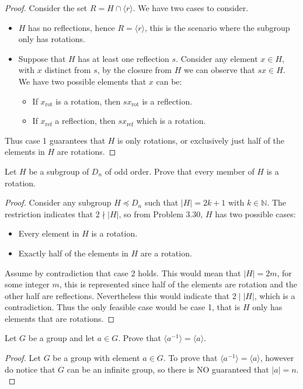 \begin{assignment}[
  header=HeaderA,
  body=BodyA,
  title={Homework 2},
  duedate={17-February-2026},
  toc=false,
  toctitle={This appears on the Table of contents.},
  exlist=false
]
\begin{exer}[Problem 3.30]
\begin{proof}
Consider the set $R = H \cap \langle r \rangle$. We have two cases to consider.
\begin{itemize}
    \item[Case 1:] $H$ has no reflections, hence $R = \langle r\rangle$, this is the scenario where the subgroup only has rotations.
    \item[Case 2:] Suppose that $H$ has at least one reflection $s$. Consider any element $x \in H$, with $x$ distinct from $s$, by the closure from $H$ we can observe that $sx \in H$. We have two possible elements that $x$ can be:
    \begin{itemize}
        \item If $x_{\text{rot}}$ is a rotation, then $sx_{\text{rot}}$ is a reflection.  
        \item If $x_{\text{ref}}$ a reflection, then $sx_{\text{ref}}$ which is a rotation. 
    \end{itemize}
\end{itemize}
Thus case 1 guarantees that $H$ is only rotations, or exclusively just half of the elements in $H$ are rotations.
\end{proof}
\end{exer}

\begin{exer}[Problem 3.31]
Let $H$ be a subgroup of $D_n$ of odd order. Prove that every member of $H$ is a rotation.
\begin{proof}
Consider any subgroup $H \preccurlyeq D_n$ such that $|H| = 2k + 1$ with $k \in \mathbb{N}$. The restriction indicates that $2 \nmid |H|$, so from Problem 3.30, $H$ has two possible cases:
\begin{itemize}
    \item[Case 1:] Every element in $H$ is a rotation.
    \item[Case 2:] Exactly half of the elements in $H$ are a rotation. 
\end{itemize}
Assume by contradiction that case 2 holds. This would mean that $|H| = 2m$, for some integer $m$, this is represented since half of the elements are rotation and the other half are reflections.  Nevertheless this would indicate that $2 \mid |H|$, which is a contradiction. Thus the only feasible case would be case 1, that is $H$ only has elements that are rotations. 
\end{proof}
\end{exer}

\begin{exer}[Problem 4.11]
Let $G$ be a group and let $a \in G$. Prove that $\langle a^{-1} \rangle = \langle a \rangle$.
\begin{proof}
Let $G$ be a group with element $a \in G$. To prove that $\langle a^{-1} \rangle = \langle a \rangle$, however do notice that $G$ can be an infinite group, so there is NO guaranteed that $|a| = n$.\\


\end{proof}
\end{exer}
\end{assignment}
